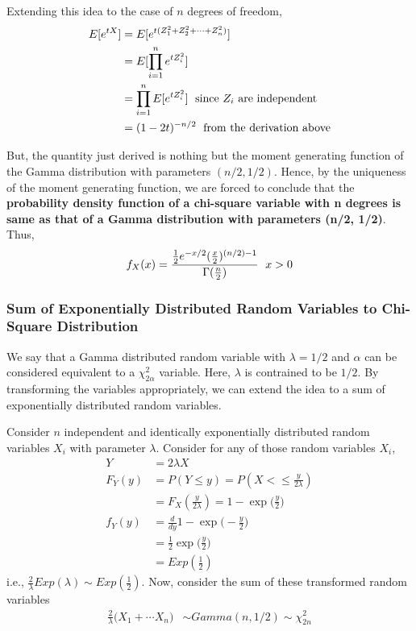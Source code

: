 \documentclass[../probability-notes.tex]{subfiles}
\begin{document}
    Extending this idea to the case of $n$ degrees of freedom,
    \begin{align*}
        E[e^{tX}] &= E[e^{t(Z_{1}^{2} + Z_{2}^{2} + \cdots + Z_{n}^{2})}]\\
        &= E[\prod_{i=1}^{n} e^{t Z_{i}^{2}}]\\
        &= \prod_{i=1}^{n} E[e^{t Z_{i}^{2}}] \text{\; since $Z_{i}$ are independent}\\
        &= (1 - 2t)^{-n/2} \text{\; from the derivation above}
    \end{align*}

    But, the quantity just derived is nothing but the moment generating function of the Gamma distribution with parameters $(n/2, 1/2)$. Hence, by the uniqueness of the moment generating function, we are forced to conclude that the \textbf{probability density function of a chi-square variable with n degrees is same as that of a Gamma distribution with parameters (n/2, 1/2)}.\newline
    Thus,
    \begin{align*}
        f_{X}(x) = \frac{\frac{1}{2} e^{-x/2} (\frac{x}{2})^{(n/2) - 1}}{\Gamma(\frac{n}{2})} \text{\; $x > 0$}
    \end{align*}

    \subsubsection{Sum of Exponentially Distributed Random Variables to Chi-Square Distribution}
    We say that a Gamma distributed random variable with $\lambda = 1/2$ and $\alpha$ can be considered equivalent to a $\chi^{2}_{2\alpha}$ variable. Here, $\lambda$ is contrained to be $1/2$. By transforming the variables appropriately, we can extend the idea to a sum of exponentially distributed random variables.\newline

    Consider $n$ independent and identically exponentially distributed random variables $X_{i}$ with parameter $\lambda$. Consider for any of those random variables $X_{i}$,
    \begin{align*}
        Y &= 2\lambda X\\
        F_{Y}(y) &= P(Y \leq y) = P(X <\leq \frac{y}{2\lambda})\\
        &= F_{X}(\frac{y}{2\lambda}) = 1 - \exp \bigg( \frac{y}{2} \bigg)\\
        f_{Y}(y) &= \frac{d}{dy} 1 - \exp \bigg( -\frac{y}{2} \bigg)\\
        &= \frac{1}{2}\exp \bigg( \frac{y}{2} \bigg)\\
        &= Exp(\frac{1}{2})
    \end{align*}
    i.e., $\frac{2}{\lambda}Exp(\lambda) \sim Exp(\frac{1}{2})$. Now, consider the sum of these transformed random variables
    \begin{align*}
        \frac{2}{\lambda}\bigg( X_{1} + \cdots X_{n} \bigg) &\sim Gamma(n, 1/2) \sim \chi_{2n}^{2}
    \end{align*}
\end{document}
